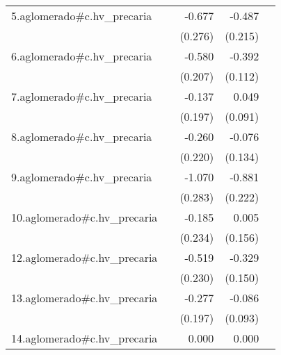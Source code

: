 {\begin{longtable}{l*{4}{D{.}{.}{-1}}}
\addlinespace
5.aglomerado#c.hv\_precaria&                     &      -0.677\sym{*}  &      -0.487\sym{*}  &                     \\
            &                     &     (0.276)         &     (0.215)         &                     \\
\addlinespace
6.aglomerado#c.hv\_precaria&                     &      -0.580\sym{**} &      -0.392\sym{***}&                     \\
            &                     &     (0.207)         &     (0.112)         &                     \\
\addlinespace
7.aglomerado#c.hv\_precaria&                     &      -0.137         &       0.049         &                     \\
            &                     &     (0.197)         &     (0.091)         &                     \\
\addlinespace
8.aglomerado#c.hv\_precaria&                     &      -0.260         &      -0.076         &                     \\
            &                     &     (0.220)         &     (0.134)         &                     \\
\addlinespace
9.aglomerado#c.hv\_precaria&                     &      -1.070\sym{***}&      -0.881\sym{***}&                     \\
            &                     &     (0.283)         &     (0.222)         &                     \\
\addlinespace
10.aglomerado#c.hv\_precaria&                     &      -0.185         &       0.005         &                     \\
            &                     &     (0.234)         &     (0.156)         &                     \\
\addlinespace
12.aglomerado#c.hv\_precaria&                     &      -0.519\sym{*}  &      -0.329\sym{*}  &                     \\
            &                     &     (0.230)         &     (0.150)         &                     \\
\addlinespace
13.aglomerado#c.hv\_precaria&                     &      -0.277         &      -0.086         &                     \\
            &                     &     (0.197)         &     (0.093)         &                     \\
\addlinespace
14.aglomerado#c.hv\_precaria&                     &       0.000         &       0.000         &                     \\

\end{longtable}}
